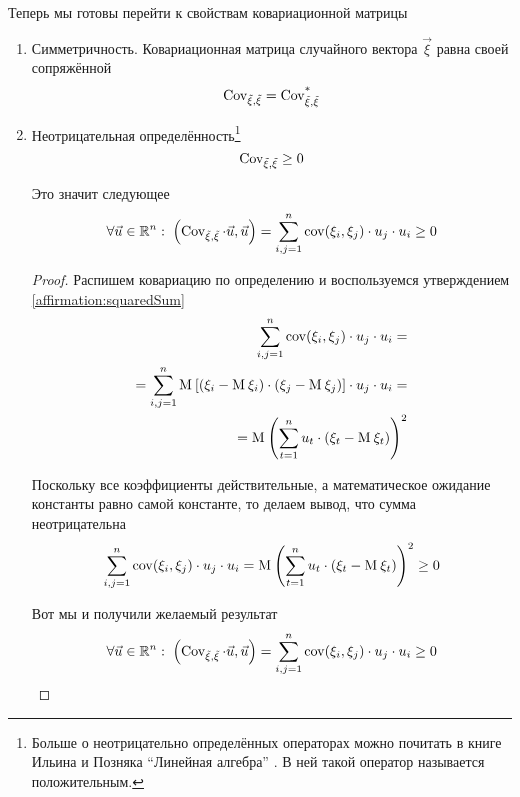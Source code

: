 Теперь мы готовы перейти к свойствам ковариационной матрицы
\begin{enumerate}
    \item Симметричность. Ковариационная матрица случайного вектора $\vec{\xi}$
        равна своей сопряжённой
        $$\operatorname{Cov_{\vec{\xi}, \vec{\xi}}} = \operatorname{Cov^*_{\vec{\xi}, \vec{\xi}}}$$
    \item Неотрицательная определённость\footnote{Больше о неотрицательно
            определённых операторах можно почитать в книге Ильина и Позняка
            ``Линейная алгебра'' \cite[с.~139]{IlinPoznyarLA}.
            В ней такой оператор называется положительным.}
        $$\operatorname{Cov_{\vec{\xi}, \vec{\xi}}} \ge 0$$

        Это значит следующее
        $$\forall \vec{u} \in \mathbb{R}^n:\;
            \left( \operatorname{Cov_{\vec{\xi}, \vec{\xi}}} \cdot \vec{u}, \vec{u} \right)
            = \sum_{i,j=1}^{n} \operatorname{cov}\!\left( \xi_i, \xi_j \right) \cdot u_j \cdot u_i
            \ge 0$$

        \begin{proof}
            Распишем ковариацию по определению и воспользуемся утверждением
            \ref{affirmation:squaredSum}
            \begin{align*}
                \sum_{i,j=1}^{n} \operatorname{cov}\!\left( \xi_i, \xi_j \right) \cdot u_j \cdot u_i = \\
                = \sum_{i,j=1}^{n} \operatorname{M}_{} \left[ \left( \xi_i - \operatorname{M}_{} \xi_i \right)
                        \cdot \left( \xi_j - \operatorname{M}_{} \xi_j \right) \right]
                        \cdot u_j \cdot u_i =\\
                = \operatorname{M}_{} \left( \sum_{t=1}^{n} u_t
                    \cdot \left( \xi_t - \operatorname{M}_{} \xi_t \right) \right)^2
            \end{align*}

            Поскольку все коэффициенты действительные, а математическое
            ожидание константы равно самой константе, то делаем вывод,
            что сумма неотрицательна
            $$\sum_{i,j=1}^{n} \operatorname{cov}\!\left( \xi_i, \xi_j \right) \cdot u_j \cdot u_i
                = \operatorname{M}_{} \left( \sum_{t=1}^{n} u_t
                    \cdot \left( \xi_t - \operatorname{M}_{} \xi_t \right) \right)^2
                \ge 0$$

            Вот мы и получили желаемый результат
            $$\forall \vec{u} \in \mathbb{R}^n:\;
                \left( \operatorname{Cov_{\vec{\xi}, \vec{\xi}}} \cdot \vec{u}, \vec{u} \right)
                = \sum_{i,j=1}^{n} \operatorname{cov}\!\left( \xi_i, \xi_j \right) \cdot u_j \cdot u_i
                \ge 0$$
        \end{proof}
\end{enumerate}

